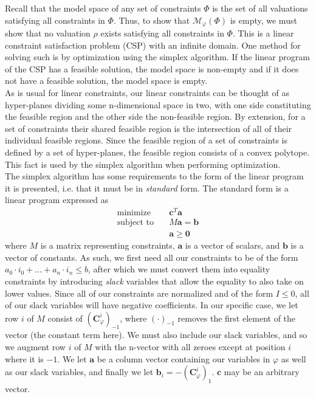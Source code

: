 Recall that the model space of any set of constraints $\Phi$ is the set of all valuations satisfying all constraints in $\Phi$. Thus, to show that $\mathcal{M}_\varphi(\Phi)$ is empty, we must show that no valuation $\rho$ exists satisfying all constraints in $\Phi$. This is a linear constraint satisfaction problem (CSP) with an infinite domain. One method for solving such is by optimization using the simplex algorithm. If the linear program of the CSP has a feasible solution, the model space is non-empty and if it does not have a feasible solution, the model space is empty.\\

As is usual for linear constraints, our linear constraints can be thought of as hyper-planes dividing some n-dimensional space in two, with one side constituting the feasible region and the other side the non-feasible region. By extension, for a set of constraints their shared feasible region is the intersection of all of their individual feasible regions. Since the feasible region of a set of constraints is defined by a set of hyper-planes, the feasible region consists of a convex polytope. This fact is used by the simplex algorithm when performing optimization.\\

The simplex algorithm has some requirements to the form of the linear program it is presented, i.e. that it must be in \textit{standard} form. The standard form is a linear program expressed as 
\begin{align*}
    \text{minimize}&\quad \mathbf{c}^T\mathbf{a}\\
    \text{subject to}&\quad M\mathbf{a} = \mathbf{b}\\
    &\quad\mathbf{a} \geq \mathbf{0}
\end{align*}
where $M$ is a matrix representing constraints, $\mathbf{a}$ is a vector of scalars, and $\mathbf{b}$ is a vector of constants. As such, we first need all our constraints to be of the form $a_0 \cdot i_0 + ... + a_n \cdot i_n \leq b$, after which we must convert them into equality constraints by introducing \textit{slack} variables that allow the equality to also take on lower values. Since all of our constraints are normalized and of the form $I \leq 0$, all of our slack variables will have negative coefficients. In our specific case, we let row $i$ of $M$ consist of $(\mathbf{C}^i_\varphi)_{-1}$, where $(\cdot)_{-1}$ removes the first element of the vector (the constant term here). We must also include our slack variables, and so we augment row $i$ of $M$ with the n-vector with all zeroes except at position $i$ where it is $-1$. We let $\mathbf{a}$ be a column vector containing our variables in $\varphi$ as well as our slack variables, and finally we let $\mathbf{b}_i = -(\mathbf{C}^i_\varphi)_1$. $\mathbf{c}$ may be an arbitrary vector.\\

